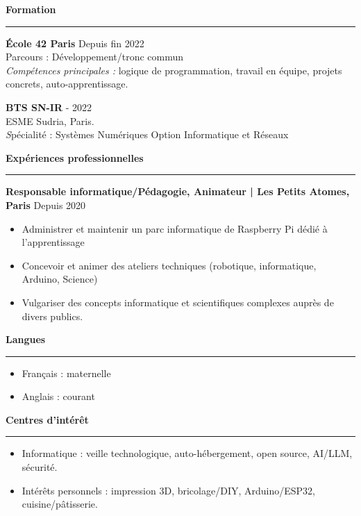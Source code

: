 \documentclass[10pt,a4paper]{article}
\newcommand{\cvsection}[1]{
      \vspace{0.8em}
      {\large\bfseries\textcolor{sectioncolor}{#1}}\\[-0.5em]
      \rule{\linewidth}{0.4pt}\vspace{0.4em}
    }
\begin{document}
\cvsection{Formation}
\textbf{École 42 Paris} \hfill Depuis fin 2022 \\
Parcours : Développement/tronc commun \\
\textit{Compétences principales :} logique de programmation, travail en équipe, projets concrets, auto-apprentissage.

\textbf{BTS SN-IR} \hfill - 2022 \\
ESME Sudria, Paris. \\
\textit Spécialité : Systèmes Numériques Option Informatique et Réseaux

\cvsection{Expériences professionnelles}
\textbf{Responsable informatique/Pédagogie, Animateur | Les Petits Atomes, Paris} \hfill Depuis 2020
\begin{itemize}
  \item Administrer et maintenir un parc informatique de Raspberry Pi dédié à l'apprentissage
  \item Concevoir et animer des ateliers techniques (robotique, informatique, Arduino, Science)
  \item Vulgariser des concepts informatique et scientifiques complexes auprès de divers publics.
\end{itemize}

\cvsection{Langues}
\begin{itemize}
  \item Français : maternelle
  \item Anglais : courant
\end{itemize}

\cvsection{Centres d'intérêt}
\begin{itemize}
  \item Informatique : veille technologique, auto-hébergement, open source, AI/LLM, sécurité.
  \item Intérêts personnels : impression 3D, bricolage/DIY, Arduino/ESP32, cuisine/pâtisserie.
\end{itemize}
\end{document}

